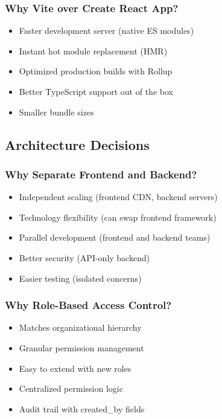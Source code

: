 \documentclass[11pt,a4paper]{article}
\begin{document}
\subsubsection{Why Vite over Create React App?}
\begin{itemize}[leftmargin=*]
    \item Faster development server (native ES modules)
    \item Instant hot module replacement (HMR)
    \item Optimized production builds with Rollup
    \item Better TypeScript support out of the box
    \item Smaller bundle sizes
\end{itemize}

\subsection{Architecture Decisions}

\subsubsection{Why Separate Frontend and Backend?}
\begin{itemize}[leftmargin=*]
    \item Independent scaling (frontend CDN, backend servers)
    \item Technology flexibility (can swap frontend framework)
    \item Parallel development (frontend and backend teams)
    \item Better security (API-only backend)
    \item Easier testing (isolated concerns)
\end{itemize}

\subsubsection{Why Role-Based Access Control?}
\begin{itemize}[leftmargin=*]
    \item Matches organizational hierarchy
    \item Granular permission management
    \item Easy to extend with new roles
    \item Centralized permission logic
    \item Audit trail with created\_by fields
\end{itemize}
\end{document}
